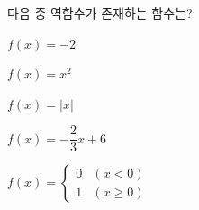 다음 중 역함수가 존재하는 함수는? 
\begin{choicesii}{\rule[-3ex]{0pt}{8ex}$f(x)=-2$}{\rule[-3ex]{0pt}{8ex}$f(x)=x^2$}{\rule[-3ex]{0pt}{8ex}$f(x)=|x|$}{\rule[-3ex]{0pt}{8ex}$f(x)=-\dfrac{2}{3}x+6$}{\rule[-3ex]{0pt}{8ex}$f(x)=\begin{cases} 0 & (x<0) \\ 1 & (x\ge 0) \end{cases}$}\end{choicesii}
